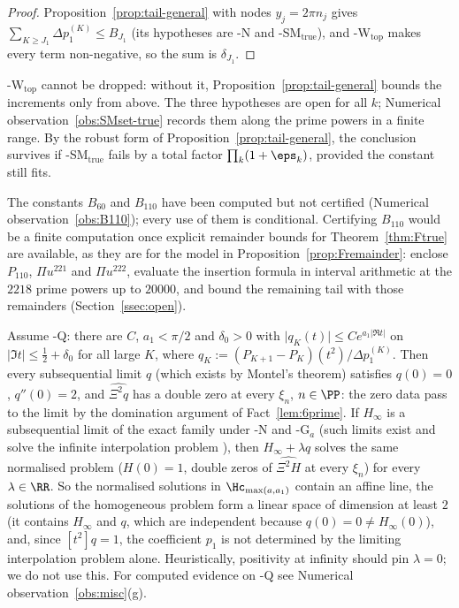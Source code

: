 \begin{proof}
Proposition~\ref{prop:tail-general} with nodes $y_j=2\pi n_j$ gives $\sum_{K\ge J_1}\Delta p_1^{(K)}\le B_{J_1}$ (its
hypotheses are \hyp{N} and \hyp{SM}$_{\mathrm{true}}$), and \hyp{W}$_{\mathrm{top}}$ makes every term non-negative, so
the sum is $\delta_{J_1}$.
\end{proof}

\hyp{W}$_{\mathrm{top}}$ cannot be dropped: without it, Proposition~\ref{prop:tail-general} bounds the increments only from
above. The three hypotheses are open for all $k$; Numerical observation~\ref{obs:SMset-true} records them along the prime
powers in a finite range. By the robust form of Proposition~\ref{prop:tail-general}, the conclusion survives if
\hyp{SM}$_{\mathrm{true}}$ fails by a total factor $\prod_k(1+\eps_k)$, provided the constant still fits.

The constants $B_{60}$ and $B_{110}$ have been computed but not certified (Numerical observation~\ref{obs:B110}); every
use of them is conditional. Certifying $B_{110}$ would be a finite computation once explicit remainder bounds for
Theorem~\ref{thm:Ftrue} are available, as they are for the model in Proposition~\ref{prop:Fremainder}: enclose $P_{110}$,
$\Pi u^{221}$ and $\Pi u^{222}$, evaluate the insertion formula in interval arithmetic at the $2218$ prime powers up to
$20000$, and bound the remaining tail with those remainders (Section~\ref{ssec:open}).

\begin{remark}\label{rem:pencil}
Assume \hyp{Q}: there are $C$, $a_1<\pi/2$ and $\delta_0>0$ with $\lvert q_K(t)\rvert\le Ce^{a_1\lvert\Re t\rvert}$ on
$\lvert\Im t\rvert\le\frac12+\delta_0$ for all large $K$, where $q_K:=(P_{K+1}-P_K)(t^2)/\Delta p_1^{(K)}$. Then every
subsequential limit $q$ (which exists by Montel's theorem) satisfies $q(0)=0$, $q''(0)=2$, and $\widehat{\Xi^2q}$ has a double
zero at every $\xi_n$, $n\in\PP$: the zero data pass to the limit by the domination argument of Fact~\ref{lem:6prime}. If
$H_\infty$ is a subsequential limit of the exact family under \hyp{N} and \hyp{G$_a$} (such limits exist and solve the infinite
interpolation problem \cite{PaperI}), then $H_\infty+\lambda q$ solves the same normalised problem ($H(0)=1$, double zeros of
$\widehat{\Xi^2H}$ at every $\xi_n$) for every $\lambda\in\RR$. So the normalised solutions in $\Hc_{\max(a,a_1)}$ contain an
affine line, the solutions of the homogeneous problem form a linear space of dimension at least $2$ (it contains $H_\infty$
and $q$, which are independent because $q(0)=0\ne H_\infty(0)$), and, since $[t^2]q=1$, the coefficient $p_1$ is not determined
by the limiting interpolation problem alone. Heuristically, positivity at infinity should pin $\lambda=0$; we do not use this.
For computed evidence on \hyp{Q} see Numerical observation~\ref{obs:misc}(g).
\end{remark}

